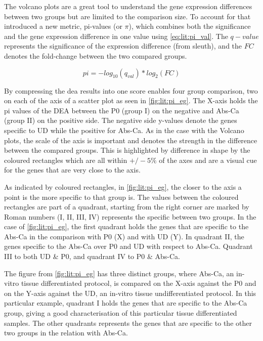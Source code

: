 The volcano plots are a great tool to understand the gene expression differences between two groups but are limited to the comparison size. To account for that \cite{Xiao2014-zn} introduced a new metric, pi-values (or $\pi$), which combines both the significance and the gene expression difference in one value using \cref{eq:lit:pi_val}. The $q-value$ represents the significance of the expression difference (from sleuth), and the $FC$ denotes the fold-change between the two compared groups. 

\begin{equation} \label{eq:lit:pi_val}
    pi = - log_{10}(q_{val}) * log_{2}(FC)
\end{equation} 

By compressing the \acrshort{dea} results into one score enables four group comparison, two on each of the axis of a scatter plot as seen in \cref{fig:lit:pi_eg}. The X-axis holds the pi values of the DEA between the P0 (group I) on the negative and Abs-Ca (group II) on the positive side. The  negative side y-values denote the genes specific to UD while the positive for Abs-Ca. As in the case with the Volcano plots, the scale of the axis is important and denotes the strength in the difference between the compared groups. This is highlighted by difference in shape by the coloured rectangles which are all within $+/-5\%$ of the axes and are a visual cue for the genes that are very close to the axis.

As indicated by coloured rectangles, in \cref{fig:lit:pi_eg}, the closer to the axis a point is the more specific to that group is. The values between the coloured rectangles are part of a quadrant, starting from the right corner are marked by Roman numbers (I, II, III, IV) represents the specific between two groups. In the case of \cref{fig:lit:pi_eg}, the first quadrant holds the genes that are specific to the Abs-Ca in the comparison with P0 (X) and with UD (Y). In quadrant II, the genes specific to the Abs-Ca over P0 and UD with respect to Abs-Ca. Quadrant III to both UD \& P0, and quadrant IV to P0 \& Abs-Ca.

The figure from \cref{fig:lit:pi_eg} has three distinct groups, where Abs-Ca, an in-vitro tissue differentiated protocol, is compared on the X-axis against the P0 and on the Y-axis against the UD, an in-vitro tissue undifferentiated protocol. In this particular example, quadrant I holds the genes that are specific to the Abs-Ca group, giving a good characterisation of this particular tissue differentiated samples. The other quadrants represents the genes that are specific to the other two groups in the relation with Abs-Ca.

